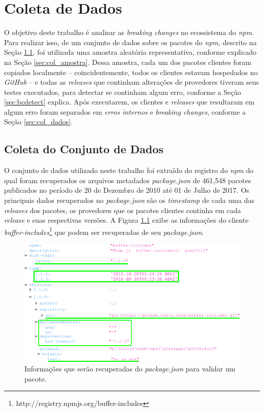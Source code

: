 \chapter{Coleta de Dados}
\label{cap:metodologia}

O objetivo deste trabalho é analisar as \textit{breaking changes} no ecossistema do \textit{npm}. Para realizar isso, de um conjunto de dados sobre os pacotes do \textit{npm}, descrito na Seção \ref{sec:col_base}, foi utilizada uma amostra aleatória representativa, conforme explicado na Seção \ref{sec:col_amostra}. Dessa amostra, cada um dos pacotes clientes foram copiados localmente -- coincidentemente, todos os clientes estavam hospedados no \textit{GitHub} -- e todas as \textit{releases} que continham alterações de provedores tiveram seus testes executados, para detectar se continham algum erro, conforme a Seção \ref{sec:bcdetect} explica. Após executarem, os clientes e \textit{releases} que resultaram em algum erro foram separados em \textit{erros internos} e \textit{breaking changes}, conforme a Seção \ref{sec:col_dados}.

\section{Coleta do Conjunto de Dados}
\label{sec:col_base}
O conjunto de dados utilizado neste trabalho foi extraído do registro do \textit{npm} do qual foram recuperados os arquivos metadados \textit{package.json} de 461,548 pacotes publicados no período de 20 de Dezembro de 2010 até 01 de Julho de 2017. Os principais dados recuperados no \textit{package.json} são os \textit{timestamp} de cada uma das \textit{releases} dos pacotes, os provedores que os pacotes clientes continha em cada \textit{release} e suas respectivas versões. A Figura \ref{fig:package_json} exibe as informações do cliente \textit{buffer-includes}\footnote{http://registry.npmjs.org/buffer-includes} que podem ser recuperadas de seu \textit{package.json}.

\begin{figure}
    \centering
    \includegraphics[scale=0.5]{figuras/package_json.png}
    \caption{Informações que serão recuperadas do \textit{package.json} para validar um pacote.}
    \label{fig:package_json}
\end{figure}{}

